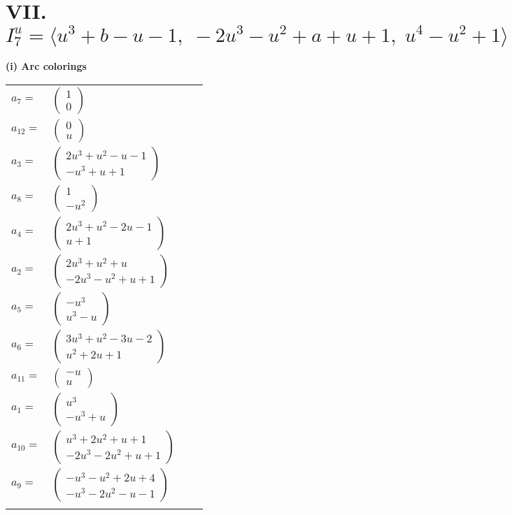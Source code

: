 \documentclass[1p]{elsarticle_modified}
\theoremstyle{definition}
\begin{document}
\centering \section*{VII. $I^u_{7}= \langle u^3+b- u-1,\;-2 u^3- u^2+a+u+1,\;u^4- u^2+1 \rangle$}
\flushleft \textbf{(i) Arc colorings}\\
\begin{tabular}{m{7pt} m{180pt} m{7pt} m{180pt} }
\flushright $a_{7}=$&$\begin{pmatrix}1\\0\end{pmatrix}$ \\
\flushright $a_{12}=$&$\begin{pmatrix}0\\u\end{pmatrix}$ \\
\flushright $a_{3}=$&$\begin{pmatrix}2 u^3+u^2- u-1\\- u^3+u+1\end{pmatrix}$ \\
\flushright $a_{8}=$&$\begin{pmatrix}1\\- u^2\end{pmatrix}$ \\
\flushright $a_{4}=$&$\begin{pmatrix}2 u^3+u^2-2 u-1\\u+1\end{pmatrix}$ \\
\flushright $a_{2}=$&$\begin{pmatrix}2 u^3+u^2+u\\-2 u^3- u^2+u+1\end{pmatrix}$ \\
\flushright $a_{5}=$&$\begin{pmatrix}- u^3\\u^3- u\end{pmatrix}$ \\
\flushright $a_{6}=$&$\begin{pmatrix}3 u^3+u^2-3 u-2\\u^2+2 u+1\end{pmatrix}$ \\
\flushright $a_{11}=$&$\begin{pmatrix}- u\\u\end{pmatrix}$ \\
\flushright $a_{1}=$&$\begin{pmatrix}u^3\\- u^3+u\end{pmatrix}$ \\
\flushright $a_{10}=$&$\begin{pmatrix}u^3+2 u^2+u+1\\-2 u^3-2 u^2+u+1\end{pmatrix}$ \\
\flushright $a_{9}=$&$\begin{pmatrix}- u^3- u^2+2 u+4\\- u^3-2 u^2- u-1\end{pmatrix}$\\&\end{tabular}
\end{document}
